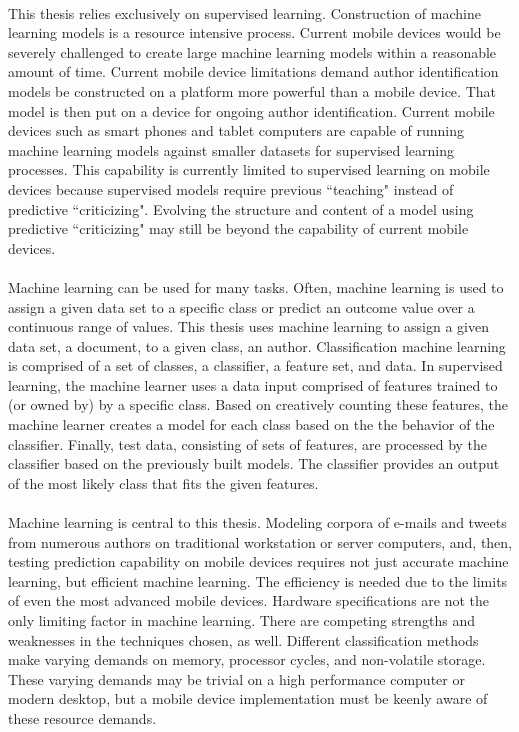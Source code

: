 	\paragraph{} This thesis relies exclusively on supervised learning. Construction of machine learning models is a resource intensive process.  Current mobile devices would be severely challenged to create large machine learning models within a reasonable amount of time. Current mobile device limitations demand author identification models be constructed on a platform more powerful than a mobile device.  That model is then put on a device for ongoing author identification. Current mobile devices such as smart phones and tablet computers are capable of running machine learning models against smaller datasets for supervised learning processes. This capability is currently limited to supervised learning on mobile devices because supervised  models require previous ``teaching" instead of predictive ``criticizing".  Evolving the structure and content of a model using predictive ``criticizing" may still be beyond the capability of current mobile devices.

	\paragraph{}Machine learning can be used for many tasks.  Often, machine learning is used to assign a given data set to a specific class or predict an outcome value over a continuous range of values. This thesis uses machine learning to assign a given data set, a document, to a given class, an author. Classification machine learning is comprised of a set of classes, a classifier, a feature set, and data.  In supervised learning, the machine learner uses a data input comprised of features trained to (or owned by) by a specific class.  Based on creatively counting these features, the machine learner creates a model for each class based on the the behavior of the classifier.  Finally, test data, consisting of sets of features, are processed by the classifier based on the previously built models.  The classifier provides an output of the most likely class that fits the given features.

	\paragraph{}Machine learning is central to this thesis.  Modeling corpora of e-mails and tweets from numerous authors on traditional workstation or server computers, and, then, testing prediction capability on mobile devices requires not just accurate machine learning, but efficient machine learning.  The efficiency is needed due to the limits of even the most advanced mobile devices. Hardware specifications are not the only limiting factor in machine learning.  There are competing strengths and weaknesses in the techniques chosen, as well.  Different classification methods make varying demands on memory, processor cycles, and non-volatile storage.  These varying demands may be trivial on a high performance computer or modern desktop, but a mobile device implementation must be keenly aware of these resource demands.
	
